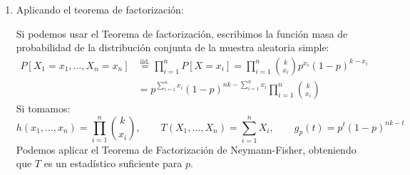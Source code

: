 \begin{ejercicio}
\begin{enumerate}
        \item Aplicando el teorema de factorización:
        
        Si podemos usar el Teorema de factorización, escribimos la función masa de probabilidad de la distribución conjunta de la muestra aleatoria simple:
        \begin{align*}
            P[X_1=x_1, \ldots, X_n = x_n] &\stackrel{\text{iid.}}{=} \prod_{i=1}^{n} P[X=x_i] = \prod_{i=1}^{n} \binom{k}{x_i} p^{x_i} {(1-p)}^{k-x_i} \\
                                            &= p^{\sum\limits_{i=1}^n x_i} {(1-p)}^{nk - \sum\limits_{i=1}^n x_i} \prod_{i=1}^{n} \binom{k}{x_i} 
        \end{align*}
        Si tomamos:
        \begin{equation*}
            h(x_1, \ldots, x_n) = \prod_{i=1}^{n}\binom{k}{x_i}, \qquad 
            T(X_1, \ldots, X_n) = \sum_{i=1}^{n} X_i, \qquad 
            g_p(t) = p^t {(1-p)}^{nk - t}
        \end{equation*}
        Podemos aplicar el Teorema de Factorización de Neymann-Fisher, obteniendo que $T$ es un estadístico suficiente para $p$.

    \end{enumerate}
\end{ejercicio}


